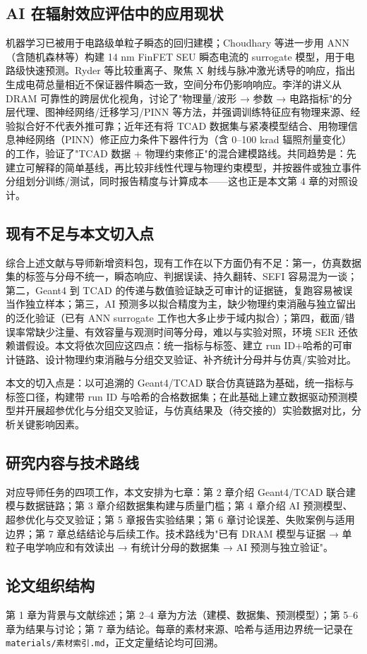 \subsection{AI 在辐射效应评估中的应用现状}

机器学习已被用于电路级单粒子瞬态的回归建模\cite{xu2021}；Choudhary 等进一步用 ANN（含随机森林等）构建 14 nm FinFET SEU 瞬态电流的 surrogate 模型，用于电路级快速预测\cite{choudhary2025}。Ryder 等比较重离子、聚焦 X 射线与脉冲激光诱导的响应，指出生成电荷总量相近不保证器件瞬态一致，空间分布仍影响响应\cite{ryder2021}。李洋的讲义从 DRAM 可靠性的跨层优化视角，讨论了"物理量/波形 → 参数 → 电路指标"的分层代理、图神经网络/迁移学习/PINN 等方法，并强调训练特征应有物理来源、经验拟合好不代表外推可靠\cite{ji2026}；近年还有将 TCAD 数据集与紧凑模型结合、用物理信息神经网络（PINN）修正应力条件下器件行为（含 0--100 krad 辐照剂量变化）的工作，验证了"TCAD 数据 + 物理约束修正"的混合建模路线\cite{ji2026}。共同趋势是：先建立可解释的简单基线，再比较非线性代理与物理约束模型，并按器件或独立事件分组划分训练/测试，同时报告精度与计算成本——这也正是本文第 4 章的对照设计。

\subsection{现有不足与本文切入点}

综合上述文献与导师新增资料包，现有工作在以下方面仍有不足：第一，仿真数据集的标签与分母不统一，瞬态响应、判据误读、持久翻转、SEFI 容易混为一谈；第二，Geant4 到 TCAD 的传递与数值验证缺乏可审计的证据链，复跑容易被误当作独立样本；第三，AI 预测多以拟合精度为主，缺少物理约束消融与独立留出的泛化验证（已有 ANN surrogate 工作也大多止步于域内拟合\cite{choudhary2025,xu2021}）；第四，截面/错误率常缺少注量、有效容量与观测时间等分母，难以与实验对照，环境 SER 还依赖谱假设。本文将依次回应这四点：统一指标与标签、建立 run ID+哈希的可审计链路、设计物理约束消融与分组交叉验证、补齐统计分母并与仿真/实验对比。

本文的切入点是：以可追溯的 Geant4/TCAD 联合仿真链路为基础，统一指标与标签口径，构建带 run ID 与哈希的合格数据集；在此基础上建立数据驱动预测模型并开展超参优化与分组交叉验证，与仿真结果及（待交接的）实验数据对比，分析关键影响因素。

\subsection{研究内容与技术路线}

对应导师任务的四项工作，本文安排为七章：第 2 章介绍 Geant4/TCAD 联合建模与数据链路；第 3 章介绍数据集构建与质量门槛；第 4 章介绍 AI 预测模型、超参优化与交叉验证；第 5 章报告实验结果；第 6 章讨论误差、失败案例与适用边界；第 7 章总结结论与后续工作。技术路线为"已有 DRAM 模型与证据 → 单粒子电学响应和有效读出 → 有统计分母的数据集 → AI 预测与独立验证"。

\subsection{论文组织结构}

第 1 章为背景与文献综述；第 2--4 章为方法（建模、数据集、预测模型）；第 5--6 章为结果与讨论；第 7 章为结论。每章的素材来源、哈希与适用边界统一记录在 \texttt{materials/素材索引.md}，正文定量结论均可回溯。
